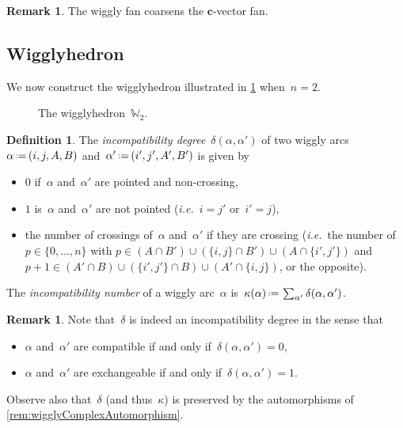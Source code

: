 \documentclass{amsart}
\theoremstyle{definition}
\newtheorem{definition}[theorem]{Definition}
\newtheorem{remark}[theorem]{Remark}
\renewcommand{\b}[1]{{\boldsymbol{#1}}} %
\newcommand{\eqdef}{\mbox{\,\raisebox{0.2ex}{\scriptsize\ensuremath{\mathrm:}}\ensuremath{=}\,}} %
\newcommand{\ie}{\textit{i.e.}~} %
\newcommand{\darkblue}{\color{darkblue}} %
\newcommand{\defn}[1]{\textsl{\darkblue #1}} %
\newcommand{\vincent}[1]{\todo[color=blue!30]{\rm #1 \\ \hfill --- V.}}
\newcommand{\polytope}[1]{\mathds{#1}} %
\newcommand{\wigglyhedron}{\polytope{W}} %
\begin{document}
\begin{remark}
The wiggly fan coarsens the $\b{c}$-vector fan.
\vincent{todo}
\end{remark}


\subsection{Wigglyhedron}
\label{subsec:wigglyhedron}

We now construct the wigglyhedron illustrated in \cref{fig:wigglyhedron} when~${n = 2}$.
%
\begin{figure}[t]
\centerline{}
\caption{The wigglyhedron~$\wigglyhedron_2$.}
\label{fig:wigglyhedron}
\end{figure}

\begin{definition}
\label{def:incompatibilityDegree}
The \defn{incompatibility degree}~$\delta(\alpha, \alpha')$ of two wiggly arcs~$\alpha \eqdef (i, j, A, B)$ and~$\alpha' \eqdef (i', j', A', B')$ is given by
\begin{itemize}
\item $0$ if~$\alpha$ and~$\alpha'$ are pointed and non-crossing,
\item $1$ is~$\alpha$ and~$\alpha'$ are not pointed (\ie $i = j'$ or~$i' = j$),
\item the number of crossings of~$\alpha$ and~$\alpha'$ if they are crossing (\ie the number of~$p \in \{0, \dots, n\}$ with $p \in (A \cap B') \cup (\{i,j\} \cap B') \cup (A \cap \{i',j'\})$ and~$p+1 \in (A' \cap B) \cup (\{i',j'\} \cap B) \cup (A' \cap \{i,j\})$, or the opposite).
\end{itemize}
The \defn{incompatibility number} of a wiggly arc~$\alpha$ is~$\kappa(\alpha) \eqdef \sum_{\alpha'} \delta(\alpha, \alpha')$.
\end{definition}

\begin{remark}
Note that~$\delta$ is indeed an incompatibility degree in the sense that
\begin{itemize}
\item $\alpha$ and~$\alpha'$ are compatible if and only if~$\delta(\alpha, \alpha') = 0$,
\item $\alpha$ and~$\alpha'$ are exchangeable if and only if~$\delta(\alpha, \alpha') = 1$.
\end{itemize}
Observe also that~$\delta$ (and thus~$\kappa$) is preserved by the automorphisms of \cref{rem:wigglyComplexAutomorphism}.
\end{remark}
\end{document}
